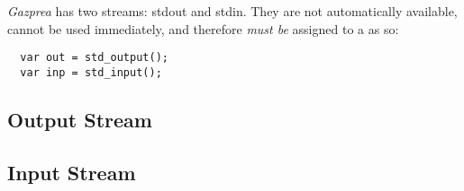 \documentclass[../../gazprea.tex]{subfiles}
\begin{document}
\textit{Gazprea} has two streams: stdout and stdin. They are not automatically available, cannot be
used immediately, and therefore \textit{must be} assigned to a  as so:
\begin{lstlisting}
  var out = std_output();
  var inp = std_input();
\end{lstlisting}


\subsection{Output Stream}
\label{ssec:output}


\subsection{Input Stream}
\label{ssec:input}

\end{document}
